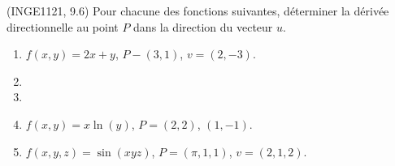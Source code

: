 
\begin{exercice}\label{exoDerrivePartielle-0000}

	(INGE1121, 9.6) Pour chacune des fonctions suivantes, déterminer la dérivée directionnelle au point $P$ dans la direction du vecteur $u$.
	\begin{enumerate}

		\item
			$f(x,y)=2x+y$, $P-(3,1)$, $v=(2,-3)$.
		\item
		\item
		\item
			$f(x,y)=x\ln(y)$, $P=(2,2)$, $(1,-1)$.
		\item
			$f(x,y,z)=\sin(xyz)$, $P=(\pi,1,1)$, $v=(2,1,2)$.

	\end{enumerate}

\end{exercice}
